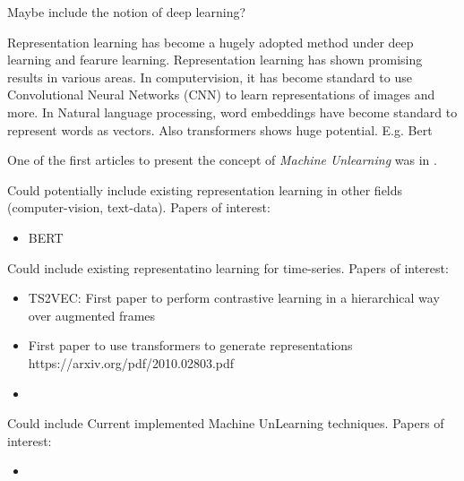 




Maybe include the notion of deep learning?


Representation learning has become a hugely adopted method under deep learning and fearure learning. Representation learning has shown promising results in various areas. In computervision, it has become standard to use Convolutional Neural Networks (CNN) to learn representations of images and more. In Natural language processing, word embeddings have become standard to represent words as vectors. Also transformers shows huge potential. E.g. Bert








One of the first articles to present the concept of \textit{Machine Unlearning} was in \cite{cao_towards_2015}. 








Could potentially include existing representation learning in other fields (computer-vision, text-data). Papers of interest:
\begin{itemize}
    \item BERT 
\end{itemize}
Could include existing representatino learning for time-series. Papers of interest:
\begin{itemize}
    \item TS2VEC: First paper to perform contrastive learning in a hierarchical way over augmented frames
    \item First paper to use transformers to generate representations https://arxiv.org/pdf/2010.02803.pdf
    \item 
\end{itemize}
Could include Current implemented Machine UnLearning techniques. Papers of interest:
\begin{itemize}
    \item 
\end{itemize}


